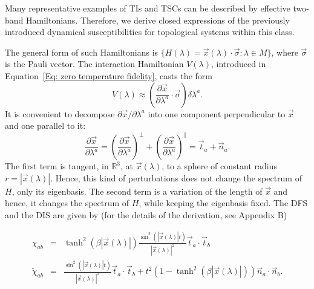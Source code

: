 Many representative examples of TIs and TSCs can be described by effective two-band Hamiltonians. Therefore, we derive closed expressions of the previously introduced dynamical susceptibilities for topological systems within this class. 

The general form of such Hamiltonians is $\{H(\lambda)=\vec{x}(\lambda)\cdot \vec\sigma:\lambda \in M\}$, where $\vec{\sigma} $  is the Pauli vector. The interaction Hamiltonian $V(\lambda)$, introduced in Equation~\eqref{Eq: zero temperature fidelity}, casts the form
\begin{equation*}
V(\lambda)\approx \left(\frac{\partial \vec{x}}{\partial\lambda^a}\cdot \vec{\sigma}\right) \delta \lambda^a.
\end{equation*} 
It is convenient to decompose $\partial\vec{x}/\partial \lambda^a$ into one component perpendicular to $\vec{x}$ and one parallel to it:
\begin{equation*}
\frac{\partial \vec{x}}{\partial\lambda^a}=\left(\frac{\partial \vec{x}}{\partial\lambda^a}\right)^{\perp}+ \left(\frac{\partial \vec{x}}{\partial\lambda^a}\right)^{\parallel}=\vec{t}_{a}+\vec{n}_a.
\end{equation*}
The first term is tangent, in $\mathbb{R}^3$, at $\vec{x}(\lambda)$, to a sphere of constant radius $r=|\vec{x}(\lambda)|$. Hence, this kind of perturbations does not change the spectrum of $H$, only its eigenbasis. The second term is a variation of the length of $\vec{x}$ and hence, it changes the spectrum of $H$, while keeping the eigenbasis fixed. The DFS and the DIS are given by (for the details of the derivation, see Appendix B)
\begin{small}
\begin{eqnarray}
\label{Eq: DFS}
\chi_{ab}&=&\tanh^2(\beta |\vec{x}(\lambda)|)\frac{\sin^2(|\vec{x}(\lambda)|t)}{|\vec{x}(\lambda)|^2}\vec{t}_a\!\!\cdot\!\vec{t}_b \\
\label{Eq: DIS}
\tilde{\chi}_{ab}\!&=&\!\frac{\sin^2(|\vec{x}(\lambda)|t)}{|\vec{x}(\lambda)|^2}\vec{t}_a\!\!\cdot\!\vec{t}_b\!+\!t^2(1\!\!-\!\!\tanh^2(\beta |\vec{x}(\lambda)|))\vec{n}_a\!\!\!\cdot\!\vec{n}_b.
\end{eqnarray}
\end{small}

